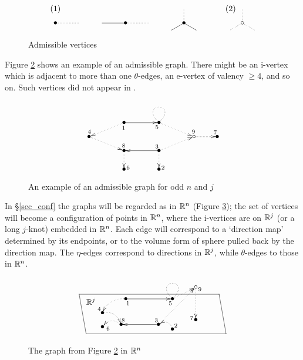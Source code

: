 \begin{figure}[htb]%
\[
 \begin{xy}
  (0,6)*{(1)},(75,6)*{(2)},
  (0,0)*{\bullet}, (30,0)*{\bullet},(55,0)*{\bullet},(80,0)*{\circ}="A",
  {\ar@{.}(0,0);(10,0)},
  {\ar@{-}(20,0);(30,0)},{\ar@{.}(30,0);(40,0)},
  {\ar@{.}(55,6);(55,0)},{\ar@{-}(55,0);(49.8038,-3)},{\ar@{-}(55,0);(60.1961,-3)},
  {\ar@{.}(80,6);"A"},{\ar@{.}"A";(74.8038,-3)},{\ar@{.}"A";(85.1961,-3)}
 \end{xy}
\]
\caption{Admissible vertices}\label{fig_admissible}
\end{figure}


Figure \ref{example_1} shows an example of an admissible graph.
There might be an i-vertex which is adjacent to more than one $\theta$-edges, an e-vertex of valency $\ge 4$, and so on.
Such vertices did not appear in \cite{CattaneoRossi05,Rossi_thesis,Watanabe07}.


\begin{figure}[htb]%
\[
 \begin{xy}
                        (15,20)*{\bullet}="A", (30,20)*{\bullet}="B",
  (0,14)*{\bullet}="C",                                               (45,14)*{\circ}="D", (55,14)*{\bullet}="E",
                        (15, 8)*{\bullet}="F", (30, 8)*{\bullet}="G",
                        (15, 0)*{\bullet}="H", (30, 0)*{\bullet}="I",
  {\ar@{.>}"A";"C"^<{1}_>{4}}, {\ar "A";"B"_>{5}},{\ar@{.}@(ru,lu)"B";"B"}, {\ar@{.>}"B";"D"^>{9}},
  {\ar@{.>}"D";"E"^>{7}},
  {\ar@{.>}"C";"F"^>{8}},{\ar "G";"F"_<{3}},{\ar@{.>}"G";"D"},
  {\ar@{.>}"F";"H"^>{6}},{\ar@{.>}"G";"I"^>{2}}
 \end{xy}
\]
\caption{An example of an admissible graph for odd $n$ and $j$}\label{example_1}
\end{figure}


In \S \ref{sec_conf} the graphs will be regarded as in $\mathbb{R}^n$ (Figure \ref{example_2}); the set of vertices will become
a configuration of points in $\mathbb{R}^n$, where the i-vertices are on $\mathbb{R}^j$ (or a long $j$-knot) embedded in $\mathbb{R}^n$.
Each edge will correspond to a `direction map' determined by its endpoints, or to the volume form of sphere pulled back
by the direction map.
The $\eta$-edges correspond to directions in $\mathbb{R}^j$, while $\theta$-edges to those in $\mathbb{R}^n$.
\begin{figure}[htb]
\[
 \begin{xy}
  {\ar@{-}(0,20);(3,3)},{\ar@{-}(3,3);(63,3)},{\ar@{-}(0,20);(60,20)},{\ar@{-}(60,20);(63,3)},
  (5,17)*{\R^j},
  (50,23)*{\circ}="A",
  (20,18)*{\bullet}="B", (40,18)*{\bullet}="C",
  (10,12)*{\bullet}="D", (18,7)*{\bullet}="E", (34,7)*{\bullet}="F",(50,9)*{\bullet}="G",
  (10,6)*{\bullet}="H",  (40,5)*{\bullet}="I",
  {\ar@{.>}@/_/"B";"D"_>{4}},{\ar "B";"C"_<{1}_>{5}},{\ar@{.}@(ru,lu)"C";"C"}, {\ar@{.>}"C";"A"},
  {\ar@{.>}@/^/"D";"E"},{\ar "F";"E"_<{3}_>{8}}, {\ar@{.>}"F";"A"},{\ar@{.>}@/_/"I";"F"_<{2}},
  {\ar@{.>}"A";"G"^<{9}_>{7}},{\ar@{.>}@/_/"E";"H"^>{6}}
 \end{xy}
\]
\caption{The graph from Figure \ref{example_1} in $\mathbb{R}^n$}\label{example_2}
\end{figure}


